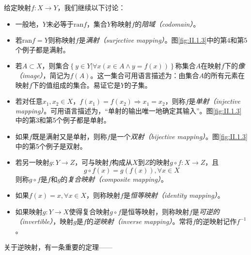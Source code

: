 \documentclass[../main.tex]{subfiles}
\begin{document}
给定映射$f:X\rightarrow Y$，我们继续以下讨论：
\begin{itemize}
    \item 一般地，$Y$未必等于$\mathrm{ran}f$，集合$Y$称映射$f$的\emph{陪域（codomain）}。
    \item 若$\mathrm{ran}f=Y$则称映射$f$是\emph{满射（surjective mapping）}。图\ref{fig:II.1.3}中的第4和第5个例子都是满射。
    \item 若$A\subset X$，则集合$\left\{y\in Y|\forall x\left(x\in A\wedge y=f\left(x\right)\right)\right\}$称集合$A$在映射$f$下的\emph{像（image）}，简记为$f\left(A\right)$。这一集合可用语言描述为：由集合$A$的所有元素在映射$f$下的值组成的集合。易证它是$Y$的子集。
    \item 若对任意$x_1,x_2\in X$，$f\left(x_1\right)=f\left(x_2\right)\Rightarrow x_1=x_2$，则称$f$是\emph{单射（injective mapping）}。可用语言描述为，“单射的输出唯一地确定其输入”。图\ref{fig:II.1.3}中的第3和第5个例子都是单射。
    \item 如果$f$既是满射又是单射，则称$f$是一个\emph{双射（bijective mapping）}。图\ref{fig:II.1.3}中的第5个例子是双射。
    \item 若另一映射$g:Y\rightarrow Z$，可与映射$f$构成从$X$到$Z$的映射$g\circ f:X\rightarrow Z$，且
          \[
              g\circ f\left(x\right)=g\left(f\left(x\right)\right),\forall x\in X
          \]
          则称$g\circ f$是$f$和$g$的\emph{复合映射（composite mapping）}。
    \item 如果$f\left(x\right)=x,\forall x\in X$，则称映射$f$是\emph{恒等映射（identity mapping）}。
    \item 如果映射$g:Y\rightarrow X$使得复合映射$g\circ f$是恒等映射，则称映射$f$是\emph{可逆的（invertible）}，映射$g$是$f$的\emph{逆映射（inverse mapping）}。常将$f$的逆映射记作$f^{-1}$。
\end{itemize}

关于逆映射，有一条重要的定理——
\end{document}
